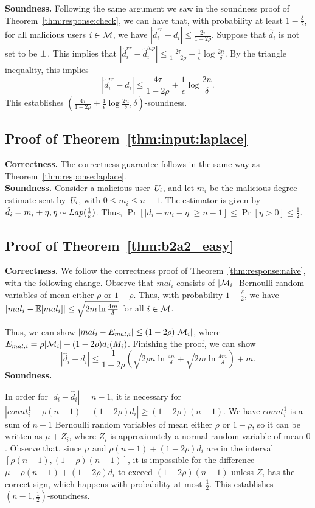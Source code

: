 \textbf{Soundness.}
Following the same argument we saw in the soundness proof of Theorem~\ref{thm:response:check}, we can have that, with probability at least $1-\frac{\delta}{2}$, for all malicious users $i \in \mathcal{M}$, we have $|\tilde{d}_i^{rr} - d_i| \leq \frac{2\tau}{1-2\rho}$. Suppose that $\hat{d}_i$ is not set to be $\perp$. This implies that $|\tilde{d}_i^{rr} - \tilde{d}_i^{lap}| \leq \frac{2\tau}{1-2\rho} + \frac{1}{\epsilon}\log \frac{2n}{\delta}$.  By the triangle inequality, this implies
\[
    |\tilde{d}_i^{rr} - d_i| \leq \frac{4\tau}{1-2\rho} + \frac{1}{\epsilon} \log \frac{2n}{\delta}.
\]
This establishes $(\frac{4\tau}{1-2\rho} + \frac{1}{\epsilon} \log \frac{2n}{\delta}, \delta)$-soundness.

\subsection{Proof of Theorem~\ref{thm:input:laplace}}\label{app:thm:input:laplace}
\textbf{Correctness.} The correctness guarantee follows in the same way as Theorem~\ref{thm:response:laplace}.
\\
\noindent \textbf{Soundness.} Consider a malicious user $\textit{U}_i$, and let $m_i$ be the malicious degree estimate sent by $\textit{U}_i$, with $0 \leq m_i \leq n-1$. The estimator is given by $\hat{d}_i = m_i+\eta, \eta \sim Lap(\frac{1}{\varepsilon})$. 
Thus, $\Pr[|d_i - m_i - \eta| \geq n-1] \leq \Pr[\eta > 0] \leq \frac{1}{2}$.


\subsection{Proof of Theorem~\ref{thm:b2a2_easy}} \label{app:thm:b2a2_easy}
\noindent \textbf{Correctness.}
We follow the correctness proof of Theorem~\ref{thm:response:naive}, with the following change. Observe that $mal_i$ consists of $|\mathcal{M}_i|$ Bernoulli random variables of mean either $\rho$ or $1-\rho$. Thus, with probability $1-\frac{\delta}{2}$, we have $|mal_i - \operatorname{\mathbb{E}}[mal_i]| \leq \sqrt{2m\ln \frac{4m}{\delta}}$ for all $i \in \mathcal{M}$. 

Thus, we can show $|mal_i - E_{mal,i}| \leq (1-2\rho) |\mathcal{M}_i|$, where $E_{mal,i} = \rho |\mathcal{M}_i| + (1-2\rho)d_i(M_i)$.
Finishing the proof, we can show 
\[
|\hat{d}_i - d_i | \leq \frac{1}{1-2\rho} (\sqrt{2\rho n \ln \tfrac{4n}{\delta}} + \sqrt{2m \ln \tfrac{4m}{\delta}}) + m.
\]
\noindent \textbf{Soundness.}

In order for $|d_i - \hat{d}_i| = n-1$, it is necessary for $|count_i^{1} - \rho(n-1) - (1-2\rho)d_i| \geq (1-2\rho)(n-1)$. We have $count_i^1$ is a sum of $n-1$ Bernoulli random variables of mean either $\rho$ or $1-\rho$, so it can be written as $\mu + Z_i$, where $Z_i$ is approximately a normal random variable of mean $0$. Observe that, since $\mu$ and $\rho(n-1) + (1-2\rho)d_i$ are in the interval $[\rho (n-1), (1-\rho)(n-1)]$, it is impossible for the difference $\mu - \rho(n-1) + (1-2\rho)d_i$ to exceed $(1-2\rho)(n-1)$ unless $Z_i$ has the correct sign, which happens with probability at most $\frac{1}{2}$. This establishes $(n-1, \frac{1}{2})$-soundness.
